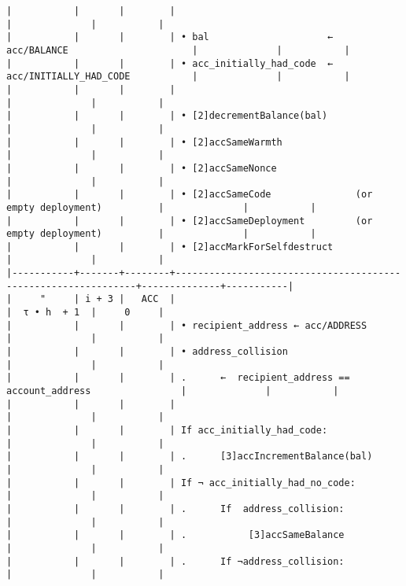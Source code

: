\documentclass[varwidth=\maxdimen,margin=0.5cm,multi={verbatim}]{standalone}
\begin{document}
\begin{verbatim}
|           |       |        |                                                               |              |           |
|           |       |        | • bal                     ←  acc/BALANCE                      |              |           |
|           |       |        | • acc_initially_had_code  ←  acc/INITIALLY_HAD_CODE           |              |           |
|           |       |        |                                                               |              |           |
|           |       |        | • [2]decrementBalance(bal)                                    |              |           |
|           |       |        | • [2]accSameWarmth                                            |              |           |
|           |       |        | • [2]accSameNonce                                             |              |           |
|           |       |        | • [2]accSameCode               (or empty deployment)          |              |           |
|           |       |        | • [2]accSameDeployment         (or empty deployment)          |              |           |
|           |       |        | • [2]accMarkForSelfdestruct                                   |              |           |
|-----------+-------+--------+---------------------------------------------------------------+--------------+-----------|
|     "     | i + 3 |   ACC  |                                                               |  τ • h  + 1  |     0     |
|           |       |        | • recipient_address ← acc/ADDRESS                             |              |           |
|           |       |        | • address_collision                                           |              |           |
|           |       |        | .      ←  recipient_address == account_address                |              |           |
|           |       |        |                                                               |              |           |
|           |       |        | If acc_initially_had_code:                                    |              |           |
|           |       |        | .      [3]accIncrementBalance(bal)                            |              |           |
|           |       |        | If ¬ acc_initially_had_no_code:                               |              |           |
|           |       |        | .      If  address_collision:                                 |              |           |
|           |       |        | .           [3]accSameBalance                                 |              |           |
|           |       |        | .      If ¬address_collision:                                 |              |           |

\end{verbatim}
\end{document}
